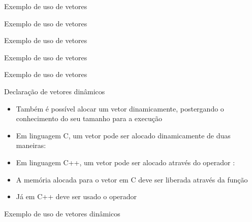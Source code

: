 \begin{frame}[fragile]{Exemplo de uso de vetores}
\end{frame}

\begin{frame}[fragile]{Exemplo de uso de vetores}
\end{frame}

\begin{frame}[fragile]{Exemplo de uso de vetores}
\end{frame}

\begin{frame}[fragile]{Exemplo de uso de vetores}
\end{frame}

\begin{frame}[fragile]{Exemplo de uso de vetores}
\end{frame}

\begin{frame}[fragile]{Declaração de vetores dinâmicos}

	\begin{itemize}
		\item Também é possível alocar um vetor dinamicamente, 
        postergando o conhecimento do seu tamanho para a execução

		\item Em linguagem C, um vetor pode ser alocado dinamicamente 
		de {duas} maneiras:

		\item Em linguagem C++, um vetor pode ser alocado através do 
		operador :

		\item A memória alocada para o vetor em C deve ser liberada através da função 

		\item Já em C++ deve ser usado o operador 
		
	\end{itemize}

\end{frame}

\begin{frame}[fragile]{Exemplo de uso de vetores dinâmicos}
\end{frame}

